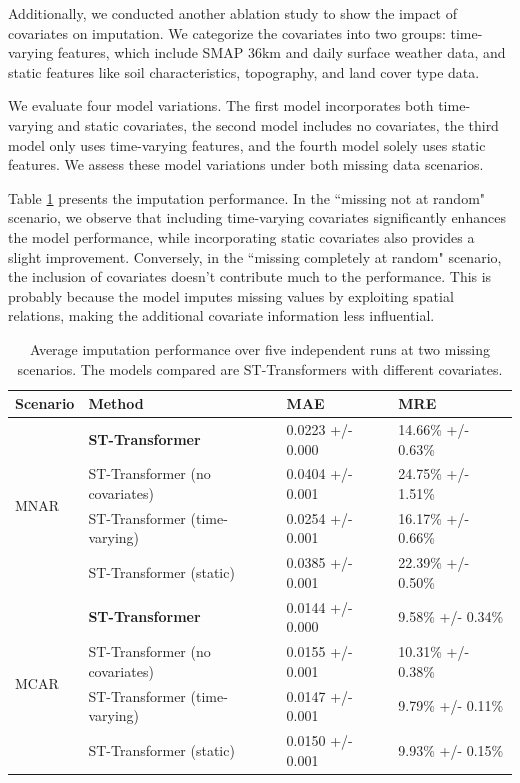 \documentclass[review]{elsarticle}
\begin{document}
Additionally, we conducted another ablation study to show the impact of covariates on imputation. We categorize the covariates into two groups: time-varying features, which include SMAP 36km and daily surface weather data, and static features like soil characteristics, topography, and land cover type data.

We evaluate four model variations. The first model incorporates both time-varying and static covariates, the second model includes no covariates, the third model only uses time-varying features, and the fourth model solely uses static features. We assess these model variations under both missing data scenarios.

Table \ref{tab: ablation_study_2} presents the imputation performance. In the ``missing not at random" scenario, we observe that including time-varying covariates significantly enhances the model performance, while incorporating static covariates also provides a slight improvement. Conversely, in the ``missing completely at random" scenario, the inclusion of covariates doesn't contribute much to the performance. This is probably because the model imputes missing values by exploiting spatial relations, making the additional covariate information less influential.


\begin{table}[h!]
    \centering
    \begin{tabularx}{\textwidth}{lXXX}
        \toprule
        Scenario&Method & MAE & MRE \\
        \midrule
        \multirow{4}{*}{MNAR}&\textbf{ST-Transformer} &  0.0223 +/- 0.000 & 14.66\% +/- 0.63\%  \\

        &ST-Transformer (no covariates) & 0.0404 +/- 0.001& 24.75\% +/- 1.51\%\\
        &ST-Transformer (time-varying) & 0.0254	 +/- 0.001& 16.17\% +/- 0.66\% \\
        &ST-Transformer (static) & 0.0385 +/- 0.001 & 22.39\% +/- 0.50\% \\
        \midrule
          \multirow{4}{*}{MCAR}&\textbf{ST-Transformer} & 0.0144 +/- 0.000 & 9.58\% +/- 0.34\%  \\
        &ST-Transformer (no covariates) & 0.0155 +/- 0.001& 10.31\% +/- 0.38\%\\
        &ST-Transformer (time-varying) & 0.0147 +/- 0.001& 9.79\% +/- 0.11\% \\
        &ST-Transformer (static) & 0.0150 +/- 0.001 & 9.93\% +/- 0.15\% \\
        \bottomrule

        
    \end{tabularx}
    \caption{Average imputation performance over five independent runs at two missing scenarios. The models compared are ST-Transformers with different covariates.}
    \label{tab: ablation_study_2}
\end{table}
\end{document}
